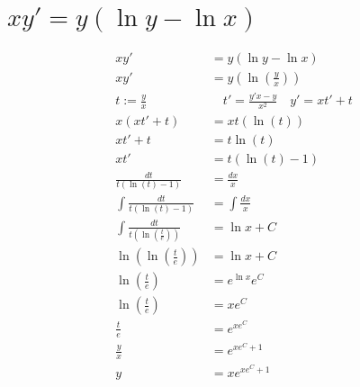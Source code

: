 

\cfoot{}



\section{$xy'=y(\ln y - \ln x)$}
\begin{align*}
    xy'                                             & = y(\ln y - \ln x)                              \\
    xy'                                             & = y\left(\ln \left(\frac{y}{x}\right)\right)    \\
    t := \frac{y}{x}                                & \quad t' = \frac{y'x-y}{x^2} \quad y' = xt' + t \\
    x(xt'+t)                                        & = xt(\ln (t))                                   \\
    xt'+t                                           & = t\ln (t)                                      \\
    xt'                                             & = t(\ln (t) - 1)                        \tag{1} \\
    \frac{dt}{t(\ln (t) - 1)}                       & = \frac{dx}{x}                                  \\
    \int \frac{dt}{t(\ln (t) - 1)}                  & = \int \frac{dx}{x}                             \\
    \int \frac{dt}{t(\ln \left(\frac{t}{e}\right))} & = \ln x + C                                     \\
    \ln \left(\ln \left(\frac{t}{e}\right)\right)   & = \ln x + C                                     \\
    \ln \left(\frac{t}{e}\right)                    & = e^{\ln x}e^C                                  \\
    \ln \left(\frac{t}{e}\right)                    & = xe^C                                          \\
    \frac{t}{e}                                     & = e^{xe^C}                                      \\
    \frac{y}{x}                                     & = e^{xe^C+1}                                    \\
    y                                               & = xe^{xe^C+1}                                   \\
\end{align*}


